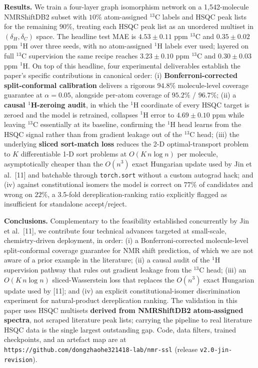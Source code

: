\documentclass[
  11pt,
  a4paper,
]{article}
\begin{document}
\textbf{Results.} We train a four-layer graph isomorphism network on a
1,542-molecule NMRShiftDB2 subset with \(10\%\) atom-assigned
\(^{13}\)C labels and HSQC peak lists for the remaining \(90\%\),
treating each HSQC peak list as an unordered multiset in
\((\delta_{H}, \delta_{C})\) space. The headline test MAE is
\(4.53 \pm 0.11\) ppm \(^{13}\)C and \(0.35 \pm 0.02\) ppm \(^{1}\)H over
three seeds, with no atom-assigned \(^{1}\)H labels ever used;
layered on full \(^{13}\)C supervision the same recipe reaches
\(3.23 \pm 0.10\) ppm \(^{13}\)C and \(0.30 \pm 0.03\) ppm \(^{1}\)H. On
top of this headline, four experimental deliverables establish the
paper's specific contributions in canonical order:
(i) \textbf{Bonferroni-corrected split-conformal calibration} delivers a
rigorous \(94.8\%\) molecule-level coverage guarantee at
\(\alpha = 0.05\), alongside per-atom coverage of \(95.2\%\) / \(96.7\%\);
(ii) a \textbf{causal \(^{1}\)H-zeroing audit}, in which the \(^{1}\)H
coordinate of every HSQC target is zeroed and the model is
retrained, collapses \(^{1}\)H error to \(4.69 \pm 0.10\) ppm while
leaving \(^{13}\)C essentially at its baseline, confirming the
\(^{1}\)H head learns from the HSQC signal rather than from
gradient leakage out of the \(^{13}\)C head; (iii) the underlying
\textbf{sliced sort-match loss} reduces the 2-D optimal-transport
problem to \(K\) differentiable 1-D sort problems at
\(O(K\,n \log n)\) per molecule, asymptotically cheaper than the
\(O(n^{3})\) exact Hungarian update used by Jin et al.~{[}11{]} and
batchable through \texttt{torch.sort} without a custom autograd hack;
and (iv) against constitutional isomers the model is correct on
\(77\%\) of candidates and wrong on \(22\%\), a 3.5-fold
dereplication-ranking ratio explicitly flagged as insufficient
for standalone accept/reject.

\textbf{Conclusions.} Complementary to the feasibility established
concurrently by Jin et al.~{[}11{]}, we contribute four technical
advances targeted at small-scale, chemistry-driven deployment, in
order: (i) a Bonferroni-corrected molecule-level split-conformal
coverage guarantee for NMR shift prediction, of which we are not
aware of a prior example in the literature; (ii) a causal audit of
the \(^{1}\)H supervision pathway that rules out gradient leakage
from the \(^{13}\)C head; (iii) an \(O(K\,n \log n)\) sliced-Wasserstein
loss that replaces the \(O(n^{3})\) exact Hungarian update used by
{[}11{]}; and (iv) an explicit constitutional-isomer discrimination
experiment for natural-product dereplication ranking. The validation
in this paper uses HSQC multisets \textbf{derived from NMRShiftDB2
atom-assigned spectra}, not scraped literature peak lists; carrying
the pipeline to real literature HSQC data is the single largest
outstanding gap. Code, data filters, trained checkpoints, and an
artefact map are at
\texttt{https://github.com/dongzhaohe321418-lab/nmr-ssl} (release
\texttt{v2.0-jin-revision}).
\end{document}
